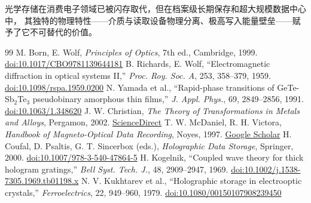 \documentclass[11pt,a4paper,twoside]{article}
\theoremstyle{definition}\newtheorem{definition}{定义}[section]
\theoremstyle{plain}\newtheorem{theorem}{定理}[section]
\theoremstyle{remark}\newtheorem{remark}{注解}[section]
\begin{document}
光学存储在消费电子领域已被闪存取代，但在档案级长期保存和超大规模数据中心中，
其独特的物理特性——介质与读取设备物理分离、极高写入能量壁垒——赋予了它不可替代的价值。

\begin{thebibliography}{99}
 M. Born, E. Wolf, \textit{Principles of Optics}, 7th ed., Cambridge, 1999. \href{https://doi.org/10.1017/CBO9781139644181}{doi:10.1017/CBO9781139644181}
 B. Richards, E. Wolf, ``Electromagnetic diffraction in optical systems II,'' \textit{Proc. Roy. Soc. A}, 253, 358--379, 1959. \href{https://doi.org/10.1098/rspa.1959.0200}{doi:10.1098/rspa.1959.0200}
 N. Yamada et al., ``Rapid-phase transitions of GeTe-Sb$_2$Te$_3$ pseudobinary amorphous thin films,'' \textit{J. Appl. Phys.}, 69, 2849--2856, 1991. \href{https://doi.org/10.1063/1.348620}{doi:10.1063/1.348620}
 J. W. Christian, \textit{The Theory of Transformations in Metals and Alloys}, Pergamon, 2002. \href{https://www.sciencedirect.com/book/monograph/9780080440194/the-theory-of-transformations-in-metals-and-alloys}{ScienceDirect}
 T. W. McDaniel, R. H. Victora, \textit{Handbook of Magneto-Optical Data Recording}, Noyes, 1997. \href{https://scholar.google.com/scholar?q=McDaniel+Victora+Handbook+Magneto-Optical+Data+Recording}{Google Scholar}
 H. Coufal, D. Psaltis, G. T. Sincerbox (eds.), \textit{Holographic Data Storage}, Springer, 2000. \href{https://doi.org/10.1007/978-3-540-47864-5}{doi:10.1007/978-3-540-47864-5}
 H. Kogelnik, ``Coupled wave theory for thick hologram gratings,'' \textit{Bell Syst. Tech. J.}, 48, 2909--2947, 1969. \href{https://doi.org/10.1002/j.1538-7305.1969.tb01198.x}{doi:10.1002/j.1538-7305.1969.tb01198.x}
 N. V. Kukhtarev et al., ``Holographic storage in electrooptic crystals,'' \textit{Ferroelectrics}, 22, 949--960, 1979. \href{https://doi.org/10.1080/00150107908239450}{doi:10.1080/00150107908239450}
\end{thebibliography}
\end{document}
